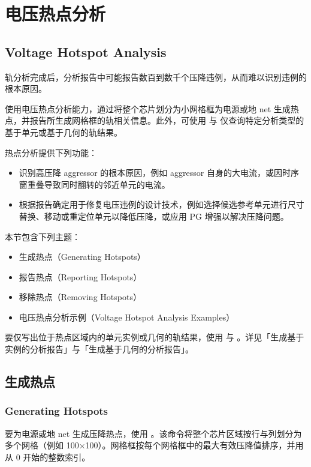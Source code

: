 \section{电压热点分析}
\subsection*{Voltage Hotspot Analysis}

轨分析完成后，分析报告中可能报告数百到数千个压降违例，从而难以识别违例的根本原因。

使用电压热点分析能力，通过将整个芯片划分为小网格框为电源或地 net 生成热点，并报告所生成网格框的轨相关信息。此外，可使用  与  仅查询特定分析类型的基于单元或基于几何的轨结果。

热点分析提供下列功能：
\begin{itemize}
  \item 识别高压降 aggressor 的根本原因，例如 aggressor 自身的大电流，或因时序窗重叠导致同时翻转的邻近单元的电流。
  \item 根据报告确定用于修复电压违例的设计技术，例如选择候选参考单元进行尺寸替换、移动或重定位单元以降低压降，或应用 PG 增强以解决压降问题。
\end{itemize}

本节包含下列主题：
\begin{itemize}
  \item 生成热点（Generating Hotspots）
  \item 报告热点（Reporting Hotspots）
  \item 移除热点（Removing Hotspots）
  \item 电压热点分析示例（Voltage Hotspot Analysis Examples）
\end{itemize}

要仅写出位于热点区域内的单元实例或几何的轨结果，使用  与 。详见「生成基于实例的分析报告」与「生成基于几何的分析报告」。

\subsection{生成热点}
\subsubsection*{Generating Hotspots}

要为电源或地 net 生成压降热点，使用 。该命令将整个芯片区域按行与列划分为多个网格（例如 100$\times$100）。网格框按每个网格框中的最大有效压降值排序，并用从 0 开始的整数索引。

